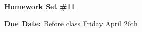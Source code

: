 
\usepackage{braket}

\def\ketY{\ensuremath{\ket {\Psi}}}
\def\iGeV{\ensuremath{\textrm{GeV}^{-1}}}
\def\mp{\ensuremath{m_{\textrm{proton}}}}
\def\rp{\ensuremath{r_{\textrm{proton}}}}
\def\me{\ensuremath{m_{\textrm{electron}}}}
\def\aG{\ensuremath{\alpha_G}}
\def\rAtom{\ensuremath{r_{\textrm{atom}}}}
\def\rNucl{\ensuremath{r_{\textrm{nucleus}}}}
\def\GN{\ensuremath{\textrm{G}_\textrm{N}}}

\def\be{\begin{equation*}}
\def\ee{\end{equation*}}


\usepackage{fancyhdr}
\usepackage{cancel}
\usepackage{ mathrsfs }





\fancyhf{}

\thispagestyle{fancy}






\begin{center}
{\huge \textbf{Homework Set \#11 }}
\large

{\textbf{ Due Date:} Before class Friday April 26th  } 
\end{center}

